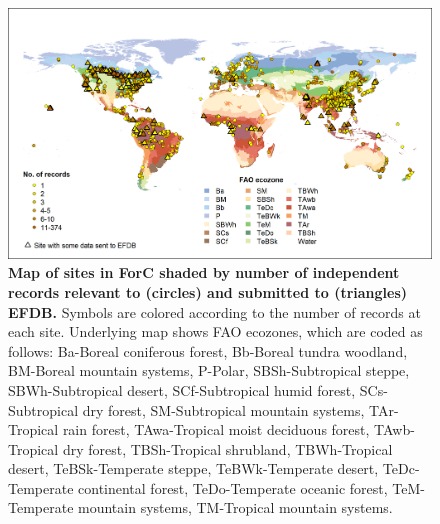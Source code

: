 \documentclass[, manuscript]{copernicus}
\begin{document}
\begin{figure}
\includegraphics[width=15cm]{figures_tables/World_Map_of_sites_with_FAO_and_IPCC_data_sent} \caption{\textbf{Map of sites in ForC shaded by number of independent records relevant to (circles) and submitted to (triangles) EFDB.} Symbols are colored according to the number of records at each site. Underlying map shows FAO ecozones, which are coded as follows: Ba-Boreal coniferous forest, Bb-Boreal tundra woodland, BM-Boreal mountain systems, P-Polar, SBSh-Subtropical steppe, SBWh-Subtropical desert, SCf-Subtropical humid forest, SCs-Subtropical dry forest, SM-Subtropical mountain systems, TAr-Tropical rain forest,  TAwa-Tropical moist deciduous forest, TAwb-Tropical dry forest, TBSh-Tropical shrubland, TBWh-Tropical desert, TeBSk-Temperate steppe, TeBWk-Temperate desert, TeDc-Temperate continental forest, TeDo-Temperate oceanic forest, TeM-Temperate mountain systems, TM-Tropical mountain systems.}\label{fig:fig_map}
\end{figure}
\end{document}
